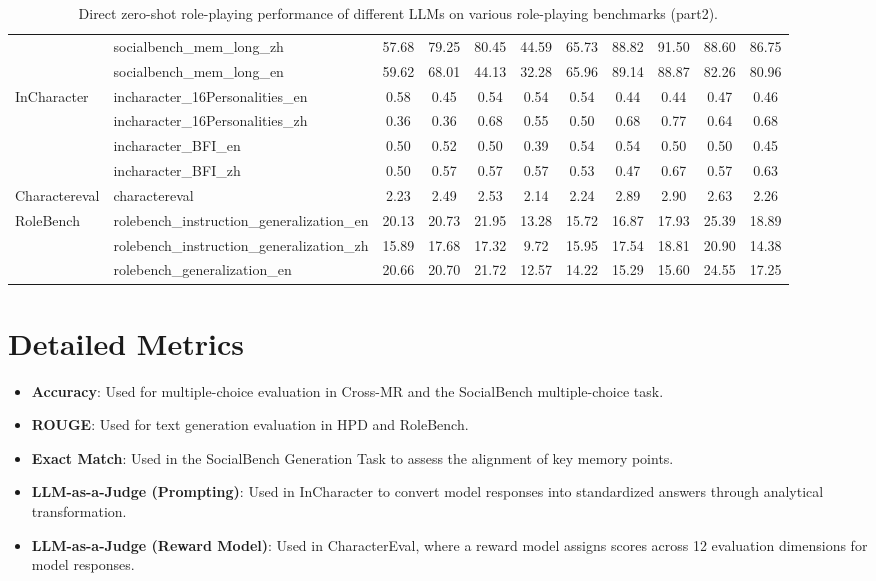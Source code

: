 \begin{table*}[ht]
{\begin{tabular}{llccccccccc}
 & socialbench\_mem\_long\_zh & 57.68 & 79.25 & 80.45 & 44.59 & 65.73 & 88.82 & 91.50 & 88.60 & 86.75 \\
 & socialbench\_mem\_long\_en & 59.62 & 68.01 & 44.13 & 32.28 & 65.96 & 89.14 & 88.87 & 82.26 & 80.96 \\
 \midrule
\multirow{4}{*}{InCharacter} & incharacter\_16Personalities\_en & 0.58 & 0.45 & 0.54 & 0.54 & 0.54 & 0.44 & 0.44 & 0.47 & 0.46 \\
 & incharacter\_16Personalities\_zh & 0.36 & 0.36 & 0.68 & 0.55 & 0.50 & 0.68 & 0.77 & 0.64 & 0.68 \\
 & incharacter\_BFI\_en & 0.50 & 0.52 & 0.50 & 0.39 & 0.54 & 0.54 & 0.50 & 0.50 & 0.45 \\
 & incharacter\_BFI\_zh & 0.50 & 0.57 & 0.57 & 0.57 & 0.53 & 0.47 & 0.67 & 0.57 & 0.63 \\
 \midrule
Charactereval & charactereval & 2.23 & 2.49 & 2.53 & 2.14 & 2.24 & 2.89 & 2.90 & 2.63 & 2.26 \\
 \midrule
\multirow{3}{*}{RoleBench} & rolebench\_instruction\_generalization\_en & 20.13 & 20.73 & 21.95 & 13.28 & 15.72 & 16.87 & 17.93 & 25.39 & 18.89 \\
 & rolebench\_instruction\_generalization\_zh & 15.89 & 17.68 & 17.32 & 9.72 & 15.95 & 17.54 & 18.81 & 20.90 & 14.38 \\
 & rolebench\_generalization\_en & 20.66 & 20.70 & 21.72 & 12.57 & 14.22 & 15.29 & 15.60 & 24.55 & 17.25 \\
\bottomrule
\end{tabular}%
}
\caption{Direct zero-shot role-playing performance of different LLMs on various role-playing benchmarks (part2).}
\label{tab:zero_shot_performance_part_2}
\end{table*}


\section{Detailed Metrics}\label{app:sec:metrics}

\begin{itemize}
    \item \textbf{Accuracy}: Used for multiple-choice evaluation in Cross-MR and the SocialBench multiple-choice task.
    \item \textbf{ROUGE}: Used for text generation evaluation in HPD and RoleBench.
    \item \textbf{Exact Match}: Used in the SocialBench Generation Task to assess the alignment of key memory points.
    \item \textbf{LLM-as-a-Judge (Prompting)}: Used in InCharacter to convert model responses into standardized answers through analytical transformation.
    \item \textbf{LLM-as-a-Judge (Reward Model)}: Used in CharacterEval, where a reward model assigns scores across 12 evaluation dimensions for model responses.
\end{itemize}


